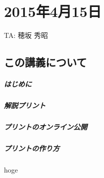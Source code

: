 \chapter{2015年4月15日}

\begin{flushright}
TA: 穂坂 秀昭
\end{flushright}

\section{この講義について}

\paragraph{はじめに}

\paragraph{解説プリント}

\paragraph{プリントのオンライン公開}

\paragraph{プリントの作り方}


\newpage

hoge

